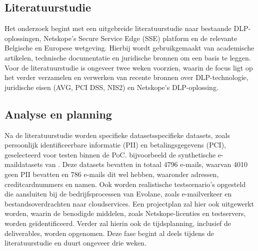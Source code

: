 

\subsection{Literatuurstudie}%

Het onderzoek begint met een uitgebreide literatuurstudie naar bestaande DLP-oplossingen, Netskope's Secure Service Edge (SSE) platform en de relevante Belgische en Europese wetgeving. 
Hierbij wordt gebruikgemaakt van academische artikelen, technische documentatie en juridische bronnen om een basis te leggen. 
Voor de literatuurstudie is ongeveer twee weken voorzien, waarin de focus ligt op het verder verzamelen en verwerken van recente bronnen
over DLP-technologie, juridische eisen (AVG, PCI DSS, NIS2) en Netskope's DLP-oplossing.

\subsection{Analyse en planning}%

Na de literatuurstudie worden specifieke datasetsspecifieke datasets, zoals persoonlijk identificeerbare informatie (PII) 
en betalingsgegevens (PCI), geselecteerd voor testen binnen de PoC. 
bijvoorbeeld de synthetische e-maildatasets van \textcite{Whelan2014}.
Deze datasets bevatten in totaal 4796 e-mails, waarvan 4010 geen PII bevatten en 786 e-mails dit wel hebben, 
waaronder adressen, creditcardnummers en namen. 
Ook worden realistische testscenario's opgesteld die aansluiten bij de bedrijfsprocessen van Evolane, zoals e-mailverkeer en bestandsoverdrachten 
naar cloudservices. Een projectplan zal hier ook uitgewerkt worden, waarin de benodigde middelen, zoals Netskope-licenties en testservers, worden 
geïdentificeerd. Verder zal hierin ook de tijdsplanning, inclusief de deliverables, worden opgenomen.
Deze fase begint al deels tijdens de literatuurstudie en duurt ongeveer drie weken.

